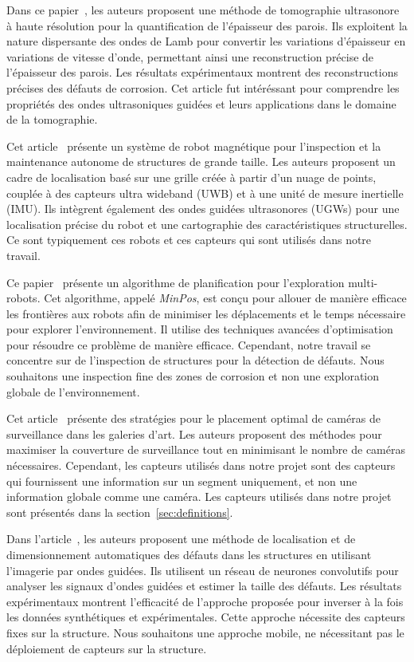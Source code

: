 \documentclass[francais,RandD]{rapportPFE}
\begin{document}
		Dans ce papier~\cite{HUTHWAITE2013979}, les auteurs proposent une méthode de tomographie ultrasonore à haute résolution pour la quantification de l'épaisseur des parois.
		Ils exploitent la nature dispersante des ondes de Lamb pour convertir les variations d'épaisseur en variations de vitesse d'onde, permettant ainsi une reconstruction précise de l'épaisseur des parois.
		Les résultats expérimentaux montrent des reconstructions précises des défauts de corrosion.
		Cet article fut intéréssant pour comprendre les propriétés des ondes ultrasoniques guidées et leurs applications dans le domaine de la tomographie.

		Cet article~\cite{s22093235} présente un système de robot magnétique pour l'inspection et la maintenance autonome de structures de grande taille.
		Les auteurs proposent un cadre de localisation basé sur une grille créée à partir d'un nuage de points, couplée à des capteurs ultra wideband (UWB) et à une unité de mesure inertielle (IMU).
		Ils intègrent également des ondes guidées ultrasonores (UGWs) pour une localisation précise du robot et une cartographie des caractéristiques structurelles.
		Ce sont typiquement ces robots et ces capteurs qui sont utilisés dans notre travail.

		Ce papier~\cite{bautin:hal-00757960} présente un algorithme de planification pour l'exploration multi-robots.
		Cet algorithme, appelé \textit{MinPos}, est conçu pour allouer de manière efficace les frontières aux robots afin de minimiser les déplacements et le temps nécessaire pour explorer l'environnement. Il utilise des techniques avancées d'optimisation pour résoudre ce problème de manière efficace.
		Cependant, notre travail se concentre sur de l'inspection de structures pour la détection de défauts.
		Nous souhaitons une inspection fine des zones de corrosion et non une exploration globale de l'environnement.

		Cet article~\cite{article455556} présente des stratégies pour le placement optimal de caméras de surveillance dans les galeries d'art.
		Les auteurs proposent des méthodes pour maximiser la couverture de surveillance tout en minimisant le nombre de caméras nécessaires.
		Cependant, les capteurs utilisés dans notre projet sont des capteurs qui fournissent une information sur un segment uniquement, et non une information globale comme une caméra.
		Les capteurs utilisés dans notre projet sont présentés dans la section~\ref{sec:definitions}.

		Dans l'article~\cite{articlesvsdf}, les auteurs proposent une méthode de localisation et de dimensionnement automatiques des défauts dans les structures en utilisant l'imagerie par ondes guidées.
		Ils utilisent un réseau de neurones convolutifs pour analyser les signaux d'ondes guidées et estimer la taille des défauts.
		Les résultats expérimentaux montrent l'efficacité de l'approche proposée pour inverser à la fois les données synthétiques et expérimentales.
		Cette approche nécessite des capteurs fixes sur la structure.
		Nous souhaitons une approche mobile, ne nécessitant pas le déploiement de capteurs sur la structure.
\end{document}
